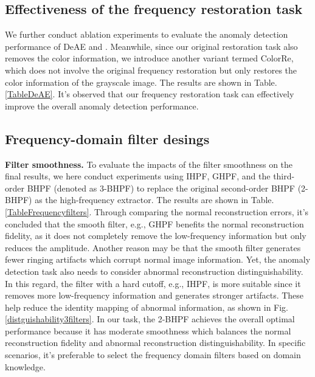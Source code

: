 \documentclass[5p, twocolumn]{elsarticle}[draft]
\begin{document}
\subsection{Effectiveness of the frequency restoration task}
We further conduct ablation experiments to evaluate the anomaly detection performance of DeAE and . Meanwhile, since our original restoration task also removes the color information, we introduce another variant termed ColorRe, which does not involve the original frequency restoration but only restores the color information of the grayscale image. The results are shown in Table. \ref{TableDeAE}. It's observed that our frequency restoration task can effectively improve the overall anomaly detection performance.  

\begin{table}[h]
\caption{Quantitative comparison of the anomaly detection performance with different reconstruction tasks. I-AUROC and P-AUROC refer to image-level and pixel-level AUROC respectively.}
\end{table}


\subsection{Frequency-domain filter desings}
\textbf{Filter smoothness.} To evaluate the impacts of the filter smoothness on the final results, we here conduct experiments using IHPF, GHPF, and the third-order BHPF (denoted as 3-BHPF) to replace the original second-order BHPF (2-BHPF) as the high-frequency extractor. The results are shown in Table. \ref{TableFrequencyfilters}. Through comparing the normal reconstruction errors, it's concluded that the smooth filter, e.g., GHPF benefits the normal reconstruction fidelity, as it does not completely remove the low-frequency information but only reduces the amplitude. Another reason may be that the smooth filter generates fewer ringing artifacts which corrupt normal image information. Yet, the anomaly detection task also needs to consider abnormal reconstruction distinguishability. In this regard, the filter with a hard cutoff, e.g., IHPF, is more suitable since it removes more low-frequency information and generates stronger artifacts. These help reduce the identity mapping of abnormal information, as shown in Fig. \ref{distguishability3filters}. In our task, the 2-BHPF achieves the overall optimal performance because it has moderate smoothness which balances the normal reconstruction fidelity and abnormal reconstruction distinguishability. In specific scenarios, it's preferable to select the frequency domain filters based on domain knowledge.
\end{document}
